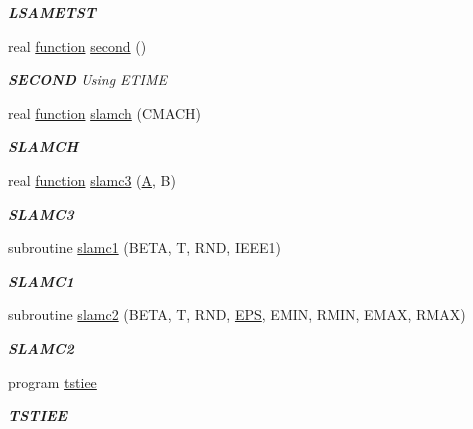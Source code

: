 \begin{DoxyCompactItemize}
\begin{DoxyCompactList}\small\item\em {\bfseries L\+S\+A\+M\+E\+T\+S\+T} \end{DoxyCompactList}\item 
real \hyperlink{afunc_8m_a7b5e596df91eadea6c537c0825e894a7}{function} \hyperlink{group__auxOTHERauxiliary_gae9f971a8b343bd2fcb85c3b16da97f10}{second} ()
\begin{DoxyCompactList}\small\item\em {\bfseries S\+E\+C\+O\+N\+D} Using E\+T\+I\+M\+E \end{DoxyCompactList}\item 
real \hyperlink{afunc_8m_a7b5e596df91eadea6c537c0825e894a7}{function} \hyperlink{group__auxOTHERauxiliary_ga279f9f1e475af3a6e6101fbfd874f955}{slamch} (C\+M\+A\+C\+H)
\begin{DoxyCompactList}\small\item\em {\bfseries S\+L\+A\+M\+C\+H} \end{DoxyCompactList}\item 
real \hyperlink{afunc_8m_a7b5e596df91eadea6c537c0825e894a7}{function} \hyperlink{group__auxOTHERauxiliary_ga063f886475dbe005f58b9c37ced98b65}{slamc3} (\hyperlink{classA}{A}, B)
\begin{DoxyCompactList}\small\item\em {\bfseries S\+L\+A\+M\+C3} \end{DoxyCompactList}\item 
subroutine \hyperlink{group__auxOTHERauxiliary_ga0259f906df485fc6fba360cb3ebef320}{slamc1} (B\+E\+T\+A, T, R\+N\+D, I\+E\+E\+E1)
\begin{DoxyCompactList}\small\item\em {\bfseries S\+L\+A\+M\+C1} \end{DoxyCompactList}\item 
subroutine \hyperlink{group__auxOTHERauxiliary_ga72e67de62733142ac7f456696018d1ef}{slamc2} (B\+E\+T\+A, T, R\+N\+D, \hyperlink{tukey_8c_a6ebf6899d6c1c8b7b9d09be872c05aae}{E\+P\+S}, E\+M\+I\+N, R\+M\+I\+N, E\+M\+A\+X, R\+M\+A\+X)
\begin{DoxyCompactList}\small\item\em {\bfseries S\+L\+A\+M\+C2} \end{DoxyCompactList}\item 
program \hyperlink{group__auxOTHERauxiliary_gac9e158139ad16abc79a0dce7ae8ad8c9}{tstiee}
\begin{DoxyCompactList}\small\item\em {\bfseries T\+S\+T\+I\+E\+E} \end{DoxyCompactList}\item 

\end{DoxyCompactItemize}
